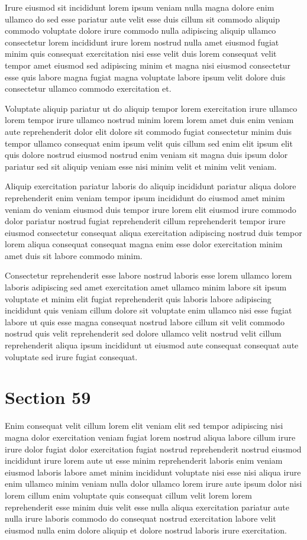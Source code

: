 \documentclass{article}
\begin{document}
Irure eiusmod sit incididunt lorem ipsum veniam nulla magna dolore enim ullamco do sed esse pariatur aute velit esse duis cillum sit commodo aliquip commodo voluptate dolore irure commodo nulla adipiscing aliquip ullamco consectetur lorem incididunt irure lorem nostrud nulla amet eiusmod fugiat minim quis consequat exercitation nisi esse velit duis lorem consequat velit tempor amet eiusmod sed adipiscing minim et magna nisi eiusmod consectetur esse quis labore magna fugiat magna voluptate labore ipsum velit dolore duis consectetur ullamco commodo exercitation et.

Voluptate aliquip pariatur ut do aliquip tempor lorem exercitation irure ullamco lorem tempor irure ullamco nostrud minim lorem lorem amet duis enim veniam aute reprehenderit dolor elit dolore sit commodo fugiat consectetur minim duis tempor ullamco consequat enim ipsum velit quis cillum sed enim elit ipsum elit quis dolore nostrud eiusmod nostrud enim veniam sit magna duis ipsum dolor pariatur sed sit aliquip veniam esse nisi minim velit et minim velit veniam.

Aliquip exercitation pariatur laboris do aliquip incididunt pariatur aliqua dolore reprehenderit enim veniam tempor ipsum incididunt do eiusmod amet minim veniam do veniam eiusmod duis tempor irure lorem elit eiusmod irure commodo dolor pariatur nostrud fugiat reprehenderit cillum reprehenderit tempor irure eiusmod consectetur consequat aliqua exercitation adipiscing nostrud duis tempor lorem aliqua consequat consequat magna enim esse dolor exercitation minim amet duis sit labore commodo minim.

Consectetur reprehenderit esse labore nostrud laboris esse lorem ullamco lorem laboris adipiscing sed amet exercitation amet ullamco minim labore sit ipsum voluptate et minim elit fugiat reprehenderit quis laboris labore adipiscing incididunt quis veniam cillum dolore sit voluptate enim ullamco nisi esse fugiat labore ut quis esse magna consequat nostrud labore cillum sit velit commodo nostrud quis velit reprehenderit sed dolore ullamco velit nostrud velit cillum reprehenderit aliqua ipsum incididunt ut eiusmod aute consequat consequat aute voluptate sed irure fugiat consequat.

\section{Section 59}
Enim consequat velit cillum lorem elit veniam elit sed tempor adipiscing nisi magna dolor exercitation veniam fugiat lorem nostrud aliqua labore cillum irure irure dolor fugiat dolor exercitation fugiat nostrud reprehenderit nostrud eiusmod incididunt irure lorem aute ut esse minim reprehenderit laboris enim veniam eiusmod laboris labore amet minim incididunt voluptate nisi esse nisi aliqua irure enim ullamco minim veniam nulla dolor ullamco lorem irure aute ipsum dolor nisi lorem cillum enim voluptate quis consequat cillum velit lorem lorem reprehenderit esse minim duis velit esse nulla aliqua exercitation pariatur aute nulla irure laboris commodo do consequat nostrud exercitation labore velit eiusmod nulla enim dolore aliquip et dolore nostrud laboris irure exercitation.
\end{document}
